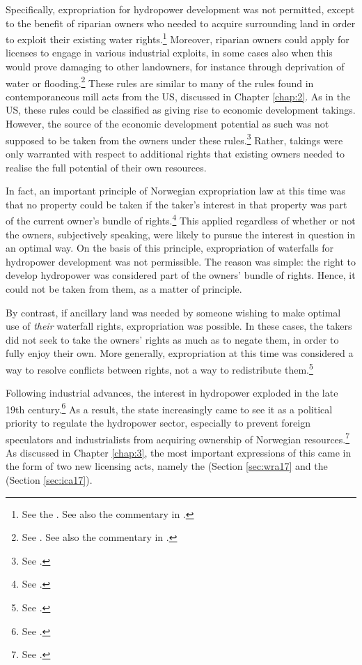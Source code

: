 Specifically, expropriation for hydropower development was not permitted, except to the benefit of riparian owners who needed to acquire surrounding land in order to exploit their existing water rights.\footnote{See the \cite[15-16]{wra88}. See also the commentary in \cite[60-65]{dahl88}.} Moreover, riparian owners could apply for licenses to engage in various industrial exploits, in some cases also when this would prove damaging to other landowners, for instance through deprivation of water or flooding.\footnote{See \cite[14]{wra88}. See also the commentary in \cite[54-60]{dahl88}.} These rules are similar to many of the rules found in contemporaneous mill acts from the US, discussed in Chapter \ref{chap:2}. As in the US, these rules could be classified as giving rise to economic development takings. However, the source of the economic development potential as such was not supposed to be taken from the owners under these rules.\footnote{See \cite[168-170]{dahl88}.} Rather, takings were only warranted with respect to additional rights that existing owners needed to realise the full potential of their own resources.

In fact, an important principle of Norwegian expropriation law at this time was that no property could be taken if the taker's interest in that property was part of the current owner's bundle of rights.\footnote{See \cite[168-170]{dahl88}.} This applied regardless of whether or not the owners, subjectively speaking, were likely to pursue the interest in question in an optimal way. On the basis of this principle, expropriation of waterfalls for hydropower development was not permissible. The reason was simple: the right to develop hydropower was considered part of the owners' bundle of rights. 
Hence, it could not be taken from them, as a matter of principle. 

By contrast, if ancillary land was needed by someone wishing to make optimal use of {\it their} waterfall rights, expropriation was possible. In these cases, the takers did not seek to take the owners' rights as much as to negate them, in order to fully enjoy their own. More generally, expropriation at this time was considered a way to resolve conflicts between rights, not a way to redistribute them.\footnote{See \cite[168-170]{dahl88}.}

Following industrial advances, the interest in hydropower exploded in the late 19th century.\footnote{See \cite[58-59]{falkanger87}.} As a result, the state increasingly came to see it as a political priority to regulate the hydropower sector, especially to prevent foreign speculators and industrialists from acquiring ownership of Norwegian resources.\footnote{See \cite[58-59]{falkanger87}.} As discussed in Chapter \ref{chap:3}, the most important expressions of this came in the form of two new licensing acts, namely the \cite{wra17} (Section \ref{sec:wra17} and the \cite{ica17} (Section \ref{sec:ica17}).

